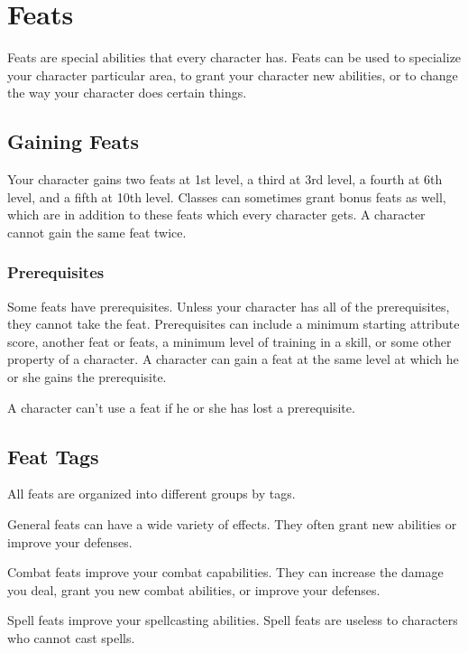 \chapter{Feats}\label{Feats}

Feats are special abilities that every character has.
Feats can be used to specialize your character particular area, to grant your character new abilities, or to change the way your character does certain things.

\section{Gaining Feats}
    Your character gains two feats at 1st level, a third at 3rd level, a fourth at 6th level, and a fifth at 10th level.
    Classes can sometimes grant bonus feats as well, which are in addition to these feats which every character gets.
    A character cannot gain the same feat twice.

    \subsection{Prerequisites}
        Some feats have prerequisites.
        Unless your character has all of the prerequisites, they cannot take the feat.
        Prerequisites can include a minimum starting attribute score, another feat or feats, a minimum level of training in a skill, or some other property of a character.
        A character can gain a feat at the same level at which he or she gains the prerequisite.

        A character can't use a feat if he or she has lost a prerequisite.

\section{Feat Tags}
    All feats are organized into different groups by tags.

     General feats can have a wide variety of effects.
    They often grant new abilities or improve your defenses.

     Combat feats improve your combat capabilities.
    They can increase the damage you deal, grant you new combat abilities, or improve your defenses.

     Spell feats improve your spellcasting abilities.
    Spell feats are useless to characters who cannot cast spells.

